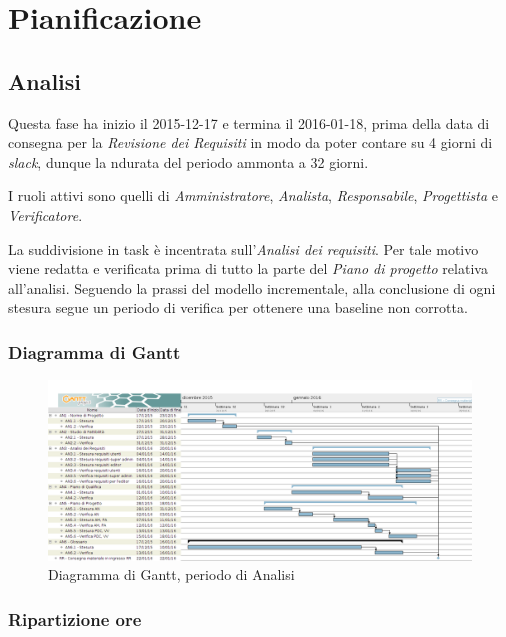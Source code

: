 \section{Pianificazione}
\subsection{Analisi}
Questa fase ha inizio il 2015-12-17 e termina il 2016-01-18, prima della data di consegna per la \textit{Revisione dei Requisiti} in modo da poter contare su 4 giorni di \textit{slack}, dunque la ndurata del periodo ammonta a 32 giorni.

I ruoli attivi sono quelli di \textit{Amministratore}, \textit{Analista}, \textit{Responsabile}, \textit{Progettista} e \textit{Verificatore}.

La suddivisione in task \`e incentrata sull'\textit{Analisi dei requisiti}. Per tale motivo viene redatta e verificata prima di tutto la parte del \textit{Piano di progetto} relativa all'analisi. Seguendo la prassi del modello incrementale, alla conclusione di ogni stesura segue un periodo di verifica per ottenere una baseline non corrotta.
\subsubsection{Diagramma di Gantt}
\begin{figure}[ht!]
\includegraphics[width=1\textwidth]{res/img/pianificazione/Analisi.png}
\caption{Diagramma di Gantt, periodo di Analisi}
\end{figure}

\subsubsection{Ripartizione ore}

